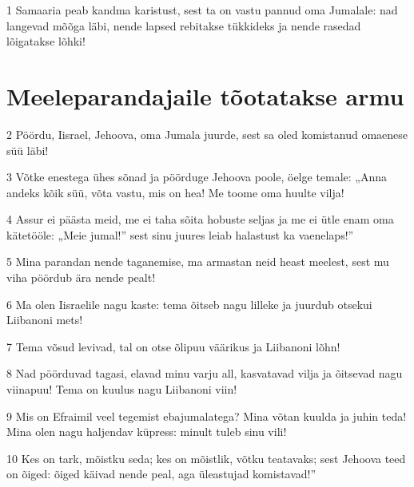 \par 1 Samaaria peab kandma karistust, sest ta on vastu pannud oma Jumalale: nad langevad mõõga läbi, nende lapsed rebitakse tükkideks ja nende rasedad lõigatakse lõhki!
\section*{Meeleparandajaile tõotatakse armu}

\par 2 Pöördu, Iisrael, Jehoova, oma Jumala juurde, sest sa oled komistanud omaenese süü läbi!
\par 3 Võtke enestega ühes sõnad ja pöörduge Jehoova poole, öelge temale: „Anna andeks kõik süü, võta vastu, mis on hea! Me toome oma huulte vilja!
\par 4 Assur ei päästa meid, me ei taha sõita hobuste seljas ja me ei ütle enam oma kätetööle: „Meie jumal!” sest sinu juures leiab halastust ka vaenelaps!”
\par 5 Mina parandan nende taganemise, ma armastan neid heast meelest, sest mu viha pöördub ära nende pealt!
\par 6 Ma olen Iisraelile nagu kaste: tema õitseb nagu lilleke ja juurdub otsekui Liibanoni mets!
\par 7 Tema võsud levivad, tal on otse õlipuu väärikus ja Liibanoni lõhn!
\par 8 Nad pöörduvad tagasi, elavad minu varju all, kasvatavad vilja ja õitsevad nagu viinapuu! Tema on kuulus nagu Liibanoni viin!
\par 9 Mis on Efraimil veel tegemist ebajumalatega? Mina võtan kuulda ja juhin teda! Mina olen nagu haljendav küpress: minult tuleb sinu vili!
\par 10 Kes on tark, mõistku seda; kes on mõistlik, võtku teatavaks; sest Jehoova teed on õiged: õiged käivad nende peal, aga üleastujad komistavad!”



